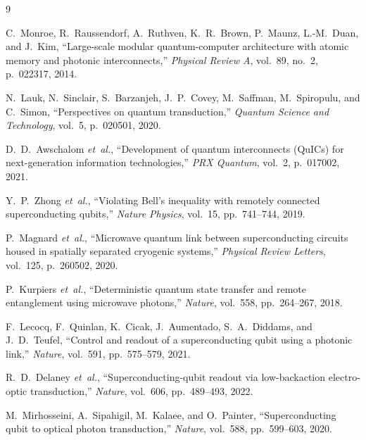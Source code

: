 \documentclass[conference]{IEEEtran}
\begin{document}
\begin{thebibliography}{9}

C.~Monroe, R.~Raussendorf, A.~Ruthven, K.~R.~Brown, P.~Maunz, L.-M.~Duan, and J.~Kim, ``Large-scale modular quantum-computer architecture with atomic memory and photonic interconnects,'' \emph{Physical Review A}, vol.~89, no.~2, p.~022317, 2014.

N.~Lauk, N.~Sinclair, S.~Barzanjeh, J.~P.~Covey, M.~Saffman, M.~Spiropulu, and C.~Simon, ``Perspectives on quantum transduction,'' \emph{Quantum Science and Technology}, vol.~5, p.~020501, 2020.

D.~D.~Awschalom \emph{et~al.}, ``Development of quantum interconnects (QuICs) for next-generation information technologies,'' \emph{PRX Quantum}, vol.~2, p.~017002, 2021.

Y.~P.~Zhong \emph{et~al.}, ``Violating Bell's inequality with remotely connected superconducting qubits,'' \emph{Nature Physics}, vol.~15, pp.~741--744, 2019.

P.~Magnard \emph{et~al.}, ``Microwave quantum link between superconducting circuits housed in spatially separated cryogenic systems,'' \emph{Physical Review Letters}, vol.~125, p.~260502, 2020.

P.~Kurpiers \emph{et~al.}, ``Deterministic quantum state transfer and remote entanglement using microwave photons,'' \emph{Nature}, vol.~558, pp.~264--267, 2018.

F.~Lecocq, F.~Quinlan, K.~Cicak, J.~Aumentado, S.~A.~Diddams, and J.~D.~Teufel, ``Control and readout of a superconducting qubit using a photonic link,'' \emph{Nature}, vol.~591, pp.~575--579, 2021.

R.~D.~Delaney \emph{et~al.}, ``Superconducting-qubit readout via low-backaction electro-optic transduction,'' \emph{Nature}, vol.~606, pp.~489--493, 2022.

M.~Mirhosseini, A.~Sipahigil, M.~Kalaee, and O.~Painter, ``Superconducting qubit to optical photon transduction,'' \emph{Nature}, vol.~588, pp.~599--603, 2020.

\end{thebibliography}
\end{document}
